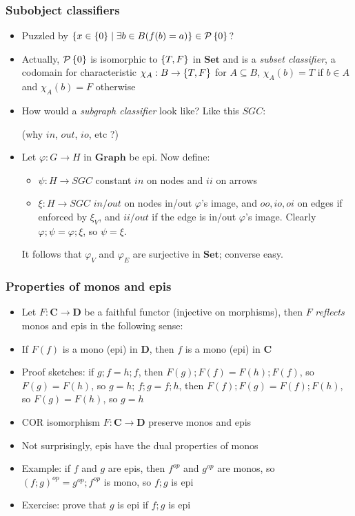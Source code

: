 \documentclass[handout]{beamer}
\newcommand{\bfsf}[1]{{\boldsymbol{#1}}}
\newcommand{\Set}{\bfsf{Set}}
\newcommand{\Gra}{\bfsf{Graph}}
\newcommand{\CC}{\bfsf{C}}
\newcommand{\DD}{\bfsf{D}}
\begin{document}
\frame
  {   
    \frametitle{Subobject classifiers}\label{Ch4:SubObj}

 \begin{itemize}[<+->]
\item Puzzled by $\{ x\in\{0\}\mid \exists b\in B (f(b)=a)\} \in \operatorname{\mathcal{P}}{\{0\}}$?
\item Actually, $\operatorname{\mathcal{P}}{\{0\}}$ is isomorphic to $\{T,F\}$ in $\Set$
and is a \emph{subset classifier}, a codomain for characteristic $\chi_A : B\to \{T,F\}$
for $A\subseteq B$, $\chi_A (b) = T$ if $b\in A$ and $\chi_A (b) = F$ otherwise
\item How would a \emph{subgraph classifier} look like? Like this $SGC$:
 (why $in$, $out$, $io$, etc ?)
\item Let $\varphi: G \to H$ in $\Gra$ be epi. Now define:
 \begin{itemize}
    \item $\psi : H\to SGC$ constant $in$ on nodes and $ii$ on arrows
    \item $\xi : H\to SGC$ $in/out$ on nodes in/out $\varphi$'s image,
     and $oo,io,oi$ on edges if enforced by  $\xi_V$, and $ii/out$ if the edge 
     is in/out $\varphi$'s image. Clearly $\varphi;\psi=\varphi;\xi$, so $\psi=\xi$.
\end{itemize}
It follows that $\varphi_V$ and  $\varphi_E$ are surjective in $\Set$; converse easy.
 \end{itemize}
 }

\frame
  {   
    \frametitle{Properties of monos and epis}\label{Ch4:MonandEp}

 \begin{itemize}[<+->]
\item Let $F: \CC\to\DD$ be a faithful functor (injective on morphisms),
then $F$ \emph{reflects} monos and epis in the following sense:
\item If $F(f)$ is a mono (epi) in $\DD$, then $f$ is a mono (epi) in $\CC$
\item Proof sketches: if $g;f=h;f$, then $F(g);F(f) = F(h); F(f)$, so $F(g)=F(h)$, so $g=h$;
$f;g=f;h$, then $F(f);F(g) =  F(f);F(h)$, so $F(g)=F(h)$, so $g=h$
\item COR isomorphism $F: \CC\to\DD$ preserve monos and epis
\item Not surprisingly, epis have the dual properties of monos
\item Example: if $f$ and $g$ are epis, then  $f^{op}$ and $g^{op}$ are monos,
so $(f;g)^{op}=g^{op} ; f^{op}$ is mono, so $f;g$ is epi
\item Exercise: prove that $g$ is epi if $f;g$ is epi
 \end{itemize}

 }
\end{document}
